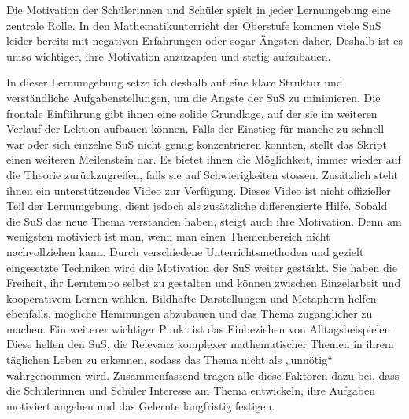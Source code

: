 \documentclass[
  10pt,
  a4paper,
  DIV=11]{scrartcl}
\theoremstyle{definition}
\theoremstyle{remark}
\begin{document}
\begin{tcolorbox}
Die Motivation der Schülerinnen und Schüler spielt in jeder Lernumgebung
eine zentrale Rolle. In den Mathematikunterricht der Oberstufe kommen
viele SuS leider bereits mit negativen Erfahrungen oder sogar Ängsten
daher. Deshalb ist es umso wichtiger, ihre Motivation anzuzapfen und
stetig aufzubauen.

In dieser Lernumgebung setze ich deshalb auf eine klare Struktur und
verständliche Aufgabenstellungen, um die Ängste der SuS zu minimieren.
Die frontale Einführung gibt ihnen eine solide Grundlage, auf der sie im
weiteren Verlauf der Lektion aufbauen können. Falls der Einstieg für
manche zu schnell war oder sich einzelne SuS nicht genug konzentrieren
konnten, stellt das Skript einen weiteren Meilenstein dar. Es bietet
ihnen die Möglichkeit, immer wieder auf die Theorie zurückzugreifen,
falls sie auf Schwierigkeiten stossen. Zusätzlich steht ihnen ein
unterstützendes Video zur Verfügung. Dieses Video ist nicht offizieller
Teil der Lernumgebung, dient jedoch als zusätzliche differenzierte
Hilfe. Sobald die SuS das neue Thema verstanden haben, steigt auch ihre
Motivation. Denn am wenigsten motiviert ist man, wenn man einen
Themenbereich nicht nachvollziehen kann. Durch verschiedene
Unterrichtsmethoden und gezielt eingesetzte Techniken wird die
Motivation der SuS weiter gestärkt. Sie haben die Freiheit, ihr
Lerntempo selbst zu gestalten und können zwischen Einzelarbeit und
kooperativem Lernen wählen. Bildhafte Darstellungen und Metaphern helfen
ebenfalls, mögliche Hemmungen abzubauen und das Thema zugänglicher zu
machen. Ein weiterer wichtiger Punkt ist das Einbeziehen von
Alltagsbeispielen. Diese helfen den SuS, die Relevanz komplexer
mathematischer Themen in ihrem täglichen Leben zu erkennen, sodass das
Thema nicht als „unnötig`` wahrgenommen wird. Zusammenfassend tragen
alle diese Faktoren dazu bei, dass die Schülerinnen und Schüler
Interesse am Thema entwickeln, ihre Aufgaben motiviert angehen und das
Gelernte langfristig festigen.

\end{tcolorbox}
\end{document}
